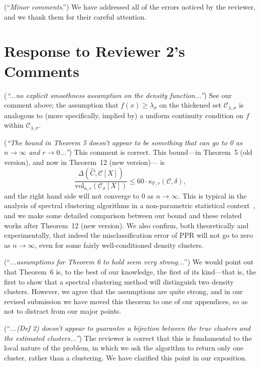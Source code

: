 \documentclass{article}
\newcommand{\vol}{\mathrm{vol}}
\newcommand{\1}{\mathbf{1}}
\newcommand{\mc}[1]{\mathcal{#1}}
\newcommand{\Pbb}{\mathbb{P}}
\newcommand{\wh}[1]{\widehat{#1}}
\theoremstyle{alden}
\theoremstyle{aldenthm}
\theoremstyle{definition}
\theoremstyle{remark}
\begin{document}
(``\textit{Minor comments}.'') We have addressed all of the errors noticed by the reviewer, and we thank them for their careful attention. 

\section{Response to Reviewer 2's Comments}

(\textit{``...no explicit smoothness assumption on the density function...''}) See our comment above; the assumption that $f(x) \geq \lambda_{\sigma}$ on the thickened set $\mc{C}_{\lambda,\sigma}$ is analogous to (more specifically, implied by) a uniform continuity condition on $f$ within $\mc{C}_{\lambda,\sigma}$. 

(\textit{``The bound in Theorem 5 doesn't appear to be something that can go to 0 as $n \to \infty$ and $r \to 0$...''}) This comment is correct. This bound---in Theorem~5 (old version), and now in Theorem~12 (new version)--- is
\begin{equation}
\label{eqn:volume_ssd_ppr}
\frac{\Delta(\wh{C},\mc{C}[X])}{\vol_{n,r}(\mc{C}_{\sigma}[X])} \leq 60 \cdot \kappa_{\Pbb,r}(\mc{C},\delta),
\end{equation}
and the right hand side will not converge to $0$ as $n \to \infty$. This is typical in the analysis of spectral clustering algorithms in a non-parametric statistical context~\citep{shi2009,schiebinger2015,garciatrillos19}, and we make some detailed comparison between our bound and these related works after Theorem~12 (new version). We also confirm, both theoretically and experimentally, that indeed the misclassification error of PPR will not go to zero as $n \to \infty$, even for some fairly well-conditioned density clusters.

(``\textit{...assumptions for Theorem 6 to hold seem very strong...}'')  We would point out that Theorem~6  is, to the best of our knowledge, the first of its kind---that is, the first to show that a spectral clustering method will distinguish two density clusters. However, we agree that the assumptions are quite strong, and in our revised submission we have moved this theorem to one of our appendices, so as not to distract from our major points. 

(``\textit{...(Def 2) doesn't appear to guarantee a bijection between the true clusters and the estimated clusters...''}) The reviewer is correct that this is fundamental to the local nature of the problem, in which we ask the algorithm to return only one cluster, rather than a clustering. We have clarified this point in our exposition. 


 
\end{document}
